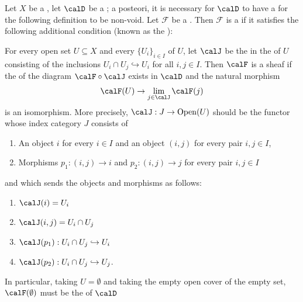 \begin{definition} \label{definition:sheaf_on_a_topological_space_valued_in_a_category_with_a_terminal_object}

    Let $X$ be a , let $\calD$ be a ; a posteori, it is necessary for $\calD$ to have a  for the following definition to be non-void. Let $\mathcal{F}$ be a .  
    Then $\mathcal{F}$ is a  if it satisfies the following additional condition (known as the ):

    For every open set $U \subseteq X$ and every  $\{U_i\}_{i \in I}$ of $U$, let $\calJ$ be the  in the  of $U$ consisting of the inclusions $U_i \cap U_j \hookrightarrow U_i$ for all $i,j \in I$. Then $\calF$ is a sheaf if the  of the diagram $\calF \circ \calJ$ exists in $\calD$ and the natural morphism
    $$\calF(U) \to \lim_{j \in \calJ} \calF(j)$$
    is an isomorphism. More precisely, $\calJ:J \to \operatorname{Open}(U)$ should be the functor whose index category $J$ consists of
    \begin{enumerate}
        \item An object $i$ for every $i \in I$ and an object $(i,j)$ for every pair $i,j \in I$,
        \item Morphisms $p_1: (i,j) \to i$ and $p_2: (i,j) \to j$ for every pair $i,j \in I$
    \end{enumerate}
    and which sends the objects and morphisms as follows:
    \begin{enumerate}
        \item $\calJ(i) = U_i$
        \item $\calJ(i,j) = U_i \cap U_j$
        \item $\calJ(p_1): U_i \cap U_j \hookrightarrow U_i$
        \item $\calJ(p_2): U_i \cap U_j \hookrightarrow U_j$.
    \end{enumerate}
    In particular, taking $U = \emptyset$ and taking the empty open cover of the empty set, $\calF(\emptyset)$ must be the  of $\calD$


\end{definition}
